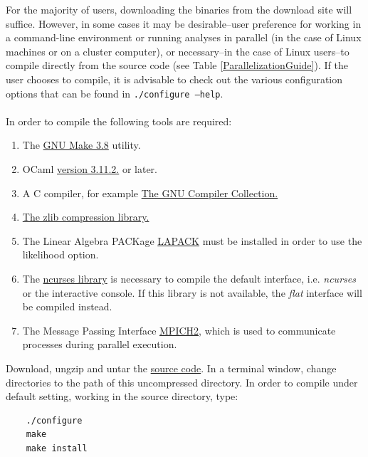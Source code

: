 For the majority of users, downloading the binaries from the \poy download site will suffice.  However, in 
some cases it may be %
 desirable--user preference for working in a command-line environment or running \poy analyses in parallel 
 (in the case of Linux machines or on a cluster computer), or necessary--in the case of Linux users--to compile \poy directly from the source code (see 
 Table %
  \ref{ParallelizationGuide}). If the user chooses to compile, it is advisable to check out the various configuration 
  options that can be found in {\tt ./configure --help}. \\
\\
In order to compile \poy the following tools are required:

\begin{enumerate}
    \item The \href{http://www.gnu.org/software/make/}{GNU Make 3.8} utility. 
    \item OCaml \href{http://www.ocaml.org}{version 3.11.2.} or later. 
    \item A C compiler, for example \href{http://gcc.gnu.org/} {The GNU Compiler Collection.}
    \item \href{http://www.zlib.net}{The zlib compression library.}
    \item The Linear Algebra PACKage \href {http://www.netlib.org/lapack/}{LAPACK} must be installed in order to 
    use the likelihood option.
    \item The \href{http://www.gnu.org/s/ncurses} {ncurses library} is necessary to compile the default interface, 
    i.e. \emph{ncurses} or the interactive console. If this library is not available, the \emph{flat} interface will be 
    compiled instead.
   \item The Message Passing Interface \href{http://www-unix.mcs.anl.gov/mpi/}{MPICH2}, which is used to communicate 
   processes during parallel execution.
\end{enumerate}
Download, ungzip and untar the \href{http://research.amnh.org/scicomp/projects/poy.php}{\poy source code}.  
In a terminal window, change directories to the path of this uncompressed directory.  
In order to compile under default setting, working in the source directory, type:
\begin{verbatim}
	./configure
	make
	make install
\end{verbatim}

